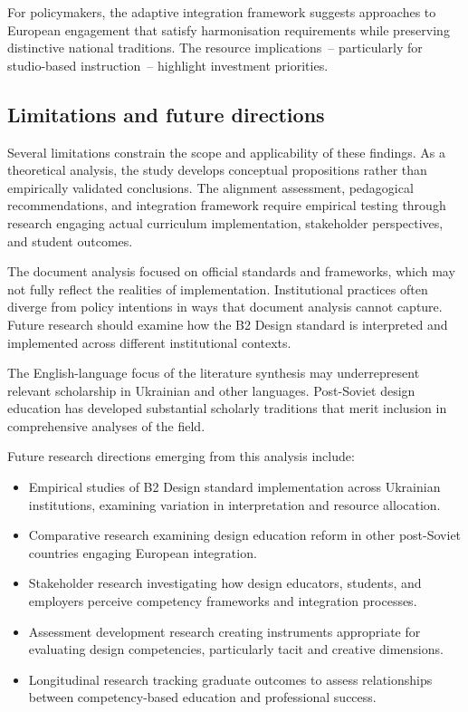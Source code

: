 \documentclass[ed]{acnsart}
\begin{document}
	For policymakers, the adaptive integration framework suggests approaches to European engagement that satisfy harmonisation requirements while preserving distinctive national traditions. The resource implications~-- particularly for studio-based instruction~-- highlight investment priorities.
	
	\subsection{Limitations and future directions}
	
	Several limitations constrain the scope and applicability of these findings. As a theoretical analysis, the study develops conceptual propositions rather than empirically validated conclusions. The alignment assessment, pedagogical recommendations, and integration framework require empirical testing through research engaging actual curriculum implementation, stakeholder perspectives, and student outcomes.
	
	The document analysis focused on official standards and frameworks, which may not fully reflect the realities of implementation. Institutional practices often diverge from policy intentions in ways that document analysis cannot capture. Future research should examine how the B2 Design standard is interpreted and implemented across different institutional contexts.
	
	The English-language focus of the literature synthesis may underrepresent relevant scholarship in Ukrainian and other languages. Post-Soviet design education has developed substantial scholarly traditions that merit inclusion in comprehensive analyses of the field.
	
	Future research directions emerging from this analysis include:
	
	\begin{itemize}
		\item Empirical studies of B2 Design standard implementation across Ukrainian institutions, examining variation in interpretation and resource allocation.
		\item Comparative research examining design education reform in other post-Soviet countries engaging European integration.
		\item Stakeholder research investigating how design educators, students, and employers perceive competency frameworks and integration processes.
		\item Assessment development research creating instruments appropriate for evaluating design competencies, particularly tacit and creative dimensions.
		\item Longitudinal research tracking graduate outcomes to assess relationships between competency-based education and professional success.
	\end{itemize}
	
\end{document}
